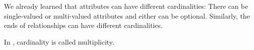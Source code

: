 %
%
%
We already learned that attributes can have different cardinalities:
There can be single-valued or multi-valued attributes and either can be optional.
Similarly, the ends of relationships can have different cardinalities.

In , cardinality is called multiplicity.
%
\FloatBarrier%
\endhsection%
%
